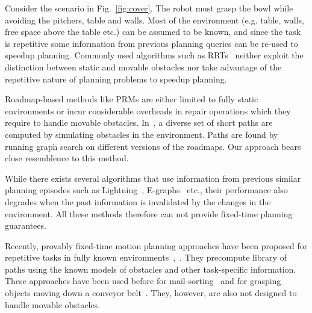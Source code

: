 \documentclass[a4paper]{report}
\begin{document}
Consider the scenario in Fig.~\ref{fig:cover}. The robot must grasp the bowl while avoiding the pitchers, table and walls.
Most of the environment (e.g. table, walls, free space above the table etc.) can be assumed to be known, and since the task is repetitive some information from previous planning queries can be re-used to speedup planning.
Commonly used algorithms such as RRTs~\cite{kuffner2000rrt} neither exploit the distinction between static and movable obstacles nor take advantage of the repetitive nature of planning problems to speedup planning. 

Roadmap-based methods like PRMs are either limited to fully static environments or incur considerable overheads in repair operations which they require to handle movable obstacles.
In~\cite{voss2015heuristic}, a diverse set of short paths are computed by simulating obstacles in the environment. Paths are found by running graph search on different versions of the roadmaps. Our approach bears close resemblence to this method.

While there exists several algorithms that use information from previous similar planning episodes such as Lightning~\cite{berenson2012robot}, E-graphs~\cite{Phillips-RSS-12} etc., their performance also degrades when the past information is invalidated by the changes in the environment. All these methods therefore can not provide fixed-time planning guarantees. 

Recently, provably fixed-time motion planning approaches have been proposed for repetitive tasks in fully known environments~\cite{islam2019provable},~\cite{islam2020provably}. They precompute library of paths using the known models of obstacles and other task-specific information. These approaches have been used before for mail-sorting~\cite{islam2019provable} and for grasping objects moving down a conveyor belt~\cite{islam2020provably}. They, however, are also not designed to handle movable obstacles.
\end{document}
